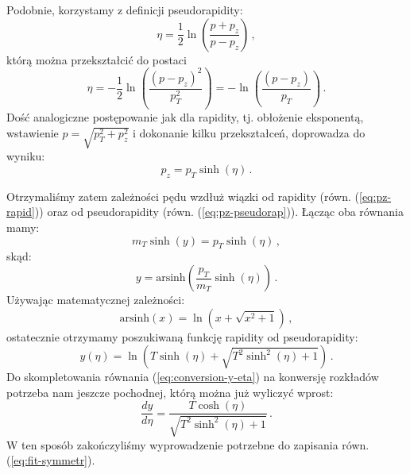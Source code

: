 \documentclass[a4paper,12pt]{article}
\begin{document}
Podobnie, korzystamy z definicji pseudorapidity:
\begin{equation} \label{eq:pseudorap}
\eta = \frac{1}{2} \ln \left( \frac{p + p_z}{p - p_z} \right)\,,
\end{equation}
którą można przekształcić do postaci
\begin{equation} \label{eq:pseudorap1}
\eta = -\frac{1}{2} \ln \left( \frac{(p - p_z)^2}{p_T^2} \right) = -\ln \left( \frac{(p - p_z)}{p_T} \right) \,.
\end{equation}
Dość analogiczne postępowanie jak dla rapidity, tj. obłożenie eksponentą, wstawienie $p = \sqrt{p_T^2 + p_z^2}$ i dokonanie kilku przekształceń, doprowadza do wyniku:
\begin{equation} \label{eq:pz-pseudorap}
p_z = p_{T} \sinh(\eta)\,.
\end{equation}

Otrzymaliśmy zatem zależności pędu wzdłuż wiązki od rapidity (równ. (\ref{eq:pz-rapid})) oraz od pseudorapidity (równ. (\ref{eq:pz-pseudorap})). Łącząc oba równania mamy:
\begin{equation} \label{eq:pz-rapid-pseudorapid}
m_{T} \sinh(y) = p_{T} \sinh(\eta)\,,
\end{equation}
skąd:
\begin{equation} \label{eq:rapid-pseudorapid-1}
y = \text{arsinh}\left(\frac{p_{T}}{m_T} \sinh(\eta)\right)\,.
\end{equation}
Używając matematycznej zależności:
\begin{equation} \label{eq:arcsinh}
\text{arsinh}(x) =  \ln\left(x + \sqrt{x^2 + 1} \right) \,,
\end{equation}
ostatecznie otrzymamy poszukiwaną funkcję rapidity od pseudorapidity:
\begin{equation} \label{eq:rapid-pseudorapid}
y(\eta) = \ln\left(T\sinh(\eta) + \sqrt{T^2\sinh^2(\eta) + 1} \right) \,.
\end{equation}
Do skompletowania równania (\ref{eq:conversion-y-eta}) na konwersję rozkładów potrzeba nam jeszcze pochodnej, którą można już wyliczyć wprost:
\begin{equation} \label{eq:rapid-pseudorapid-deriv}
\frac{dy}{d\eta} = \frac{T\cosh(\eta)}{\sqrt{T^2\sinh^2(\eta) + 1}} \,.
\end{equation}
W ten sposób zakończyliśmy wyprowadzenie potrzebne do zapisania równ. (\ref{eq:fit-symmetr}).
\end{document}
